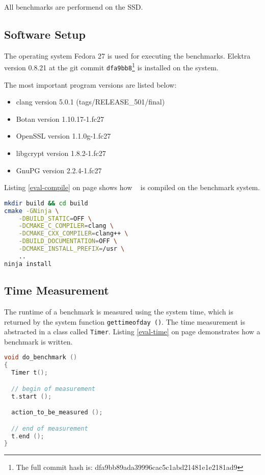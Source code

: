 All benchmarks are performend on the SSD.

  \subsection{Software Setup}

The operating system Fedora 27 is used for executing the benchmarks.
Elektra version 0.8.21 at the git commit \texttt{dfa9bb8}\footnote{The full commit hash is: dfa9bb89ada39996cac5c1abd21481e1e2181ad9} is installed on the system.

The most important program versions are listed below:

\begin{itemize}
  \item clang version 5.0.1 (tags/RELEASE\_501/final)
  \item Botan version 1.10.17-1.fc27
  \item OpenSSL version 1.1.0g-1.fc27
  \item libgcrypt version 1.8.2-1.fc27
  \item GnuPG version 2.2.4-1.fc27
\end{itemize}

Listing \ref{eval-compile} on page \pageref{eval-compile} shows how \elektra ~ is compiled on the benchmark system.

\begin{lstlisting}[label=eval-compile,language=bash,caption={Elektra compile options for the benchmarks}]
mkdir build && cd build
cmake -GNinja \
    -DBUILD_STATIC=OFF \
    -DCMAKE_C_COMPILER=clang \
    -DCMAKE_CXX_COMPILER=clang++ \
    -DBUILD_DOCUMENTATION=OFF \
    -DCMAKE_INSTALL_PREFIX=/usr \
    ..
ninja install
\end{lstlisting}

  \subsection{Time Measurement}

The runtime of a benchmark is measured using the system time, which is returned by the system function \texttt{gettimeofday ()}.
The time measurement is abstracted in a class called \texttt{Timer}.
Listing \ref{eval-time} on page \pageref{eval-time} demonstrates how a benchmark is written.

\begin{lstlisting}[label=eval-time,language=C,caption={Time measurement for the benchmarks}]
void do_benchmark ()
{
  Timer t();

  // begin of measurement
  t.start ();

  action_to_be_measured ();

  // end of measurement
  t.end ();
}
\end{lstlisting}

